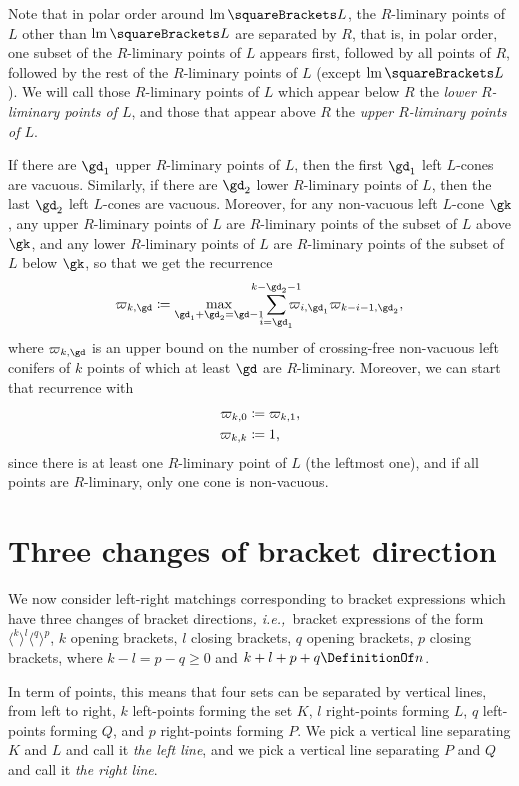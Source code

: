\documentclass[10pt, a4paper, twoside]{basestyle}
\newcommand{\idest}{\emph{, i.e.,\ }}
\DeclareMathOperator{\leftmost}{lm}
\begin{document}
Note that in polar order around $\leftmost\of L$, the $R$-liminary points of $L$ other than $\leftmost\of L$ are separated by
$R$, that is, in polar order, one subset of the $R$-liminary points of $L$ appears first, followed by
all points of $R$, followed by the rest of the $R$-liminary points of $L$ (except $\leftmost\of L$).
We will call those $R$-liminary points of $L$ which appear below $R$ the \emph{lower $R$-liminary points of $L$},
and those that appear above $R$ the \emph{upper $R$-liminary points of $L$}.

If there are $\gd_1$ upper $R$-liminary points of $L$, then the first $\gd_1$ left $L$-cones are vacuous.
Similarly, if there are $\gd_2$ lower $R$-liminary points of $L$, then the last
$\gd_2$ left $L$-cones are vacuous. Moreover, for any non-vacuous left $L$-cone $\gk$, any upper $R$-liminary points
of $L$ are $R$-liminary points of the
subset of $L$ above $\gk$, and any lower $R$-liminary points of $L$ are $R$-liminary points of the
subset of $L$ below $\gk$, so that we get the recurrence
\[\varpi_{k,\gd}\DefineAs\max_{\gd_1+\gd_2=\gd-1}\sum{i=\gd_1}[k-\gd_2-1]\varpi_{i,\gd_1}\varpi_{k-i-1,\gd_2}\text,\]
where $\varpi_{k,\gd}$ is an upper bound on the number of crossing-free non-vacuous left conifers of $k$ points
of which at least $\gd$ are $R$-liminary.
Moreover, we can start that recurrence with
\begin{align*}
\varpi_{k,0}&\coloneq\varpi_{k,1}\text,\\
\varpi_{k,k}&\coloneq1\text,
\end{align*}
since there is at least one $R$-liminary point of $L$ (the leftmost one), and if all points are $R$-liminary,
only one cone is non-vacuous.
\section{Three changes of bracket direction}
We now consider left-right matchings corresponding to bracket expressions which have three
changes of bracket directions\idest bracket expressions of the form
$\langle^k\rangle^l\langle^q\rangle^p$,
$k$ opening brackets, $l$ closing brackets, $q$ opening brackets, $p$ closing brackets, where
$k-l=p-q\geq 0$ and $k+l+p+q\DefinitionOf n$.

In term of points, this means that four sets can be separated by vertical lines, from left
to right, $k$ left-points forming the set $K$, $l$ right-points forming $L$, $q$ left-points
forming $Q$, and $p$ right-points forming $P$.
We pick a vertical line separating $K$ and $L$ and call it \emph{the left line}, and we pick
a vertical line separating $P$ and $Q$ and call it \emph{the right line}.
\end{document}
